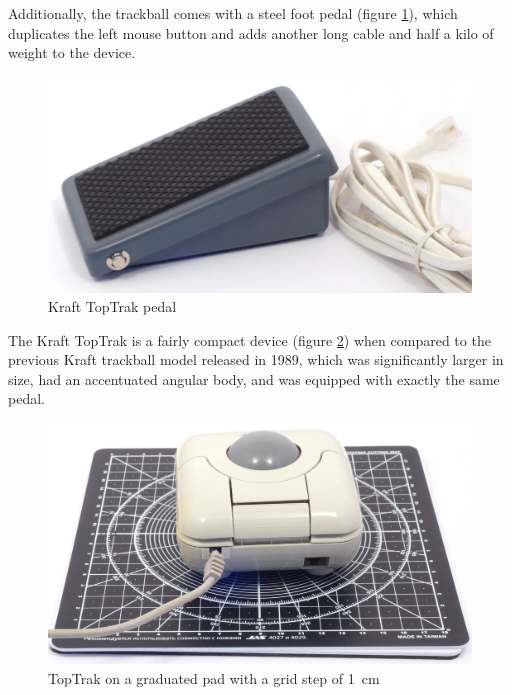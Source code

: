 \documentclass[11pt, a4paper]{article}
\begin{document}
Additionally, the trackball comes with a steel foot pedal (figure \ref{fig:TopTrakPedal}), which duplicates the left mouse button and adds another long cable and half a kilo of weight \cite{mouses} to the device.

\begin{figure}[h]
    \centering
    \includegraphics[scale=0.45]{1990_kraft_toptrack/pedal_30.jpg}
    \caption{Kraft TopTrak pedal}
    \label{fig:TopTrakPedal}
\end{figure}


The Kraft TopTrak is a fairly compact device (figure \ref{fig:TopTrakSize}) when compared to the previous Kraft trackball model released in 1989, which was significantly larger in size, had an accentuated angular body, and was equipped with exactly the same pedal.

\begin{figure}[h]
    \centering
    \includegraphics[scale=0.35]{1990_kraft_toptrack/2.6_30.jpg}
    \caption{TopTrak on a graduated pad with a grid step of 1~cm}
    \label{fig:TopTrakSize}
\end{figure}
\end{document}
